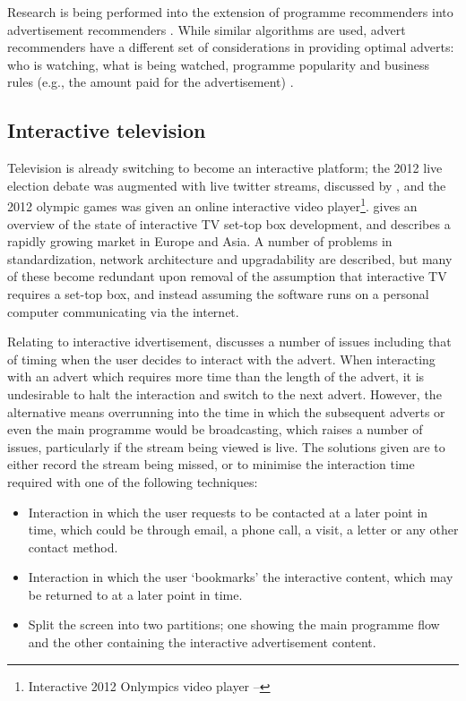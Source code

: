 	Research is being performed into the extension of programme recommenders into advertisement recommenders \citep{contextual_advertising}. While similar algorithms are used, advert recommenders have a different set of considerations in providing optimal adverts: who is watching, what is being watched, programme popularity and business rules (e.g., the amount paid for the advertisement) \citep{contextual_advertising}.

\subsection{Interactive television}

	Television is already switching to become an interactive platform; the 2012 live election debate was augmented with live twitter streams, discussed by \citep{2010_election}, and the 2012 olympic games was given an online interactive video player\footnote{Interactive 2012 Onlympics video player -- }. \citet{tv_stb_overview} gives an overview of the state of interactive TV set-top box development, and describes a rapidly growing market in Europe and Asia. A number of problems in standardization, network architecture and upgradability are described, but many of these become redundant upon removal of the assumption that interactive TV requires a set-top box, and instead assuming the software runs on a personal computer communicating via the internet.

	Relating to interactive idvertisement, \citet{integrated-approach-advertising} discusses a number of issues including that of timing when the user decides to interact with the advert. When interacting with an advert which requires more time than the length of the advert, it is undesirable to halt the interaction and switch to the next advert. However, the alternative means overrunning into the time in which the subsequent adverts or even the main programme would be broadcasting, which raises a number of issues, particularly if the stream being viewed is live. The solutions given are to either record the stream being missed, or to minimise the interaction time required with one of the following techniques:
	\begin{itemize}
		\item Interaction in which the user requests to be contacted at a later point in time, which could be through email, a phone call, a visit, a letter or any other contact method.
		\item Interaction in which the user `bookmarks' the interactive content, which may be returned to at a later point in time.
		\item Split the screen into two partitions; one showing the main programme flow and the other containing the interactive advertisement content. 
	\end{itemize}

